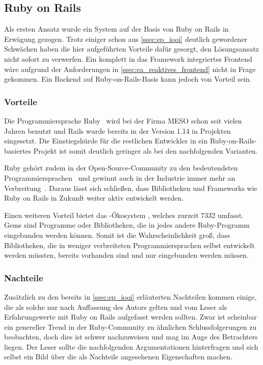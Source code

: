 \subsection{Ruby on Rails}
\label{ssec:kl_ruby_on_rails}

Als ersten Ansatz wurde ein System auf der Basis von Ruby on Rails in Erwägung
gezogen.  Trotz einiger schon aus
\cref{ssec:ep_iooi} deutlich gewordener
Schwächen haben die hier aufgeführten Vorteile dafür gesorgt, den Lösungsansatz
nicht sofort zu verwerfen.  Ein komplett in das Framework integriertes Frontend
wäre aufgrund der Anforderungen in \cref{ssec:ea_reaktives_frontend} nicht in
Frage gekommen.  Ein Backend auf Ruby-on-Rails-Basis kann jedoch von Vorteil
sein.

\subsubsection{Vorteile}
\label{sssec:elr_vorteile}

Die Programmiersprache Ruby~\cite{ruby} wird bei der Firma MESO schon seit vielen
Jahren benutzt und Rails wurde bereits in der Version 1.14 in Projekten
eingesetzt.  Die Einstiegshürde für die restlichen Entwickler in ein
Ruby-on-Rails-basiertes Projekt ist somit deutlich geringer als bei den
nachfolgenden Varianten.

Ruby gehört zudem in der Open-Source-Community zu den bedeutendsten
Programmiersprachen~\cite{ghlangtrends} und gewinnt auch in der Industrie immer
mehr an Verbreitung~\cite{tiobe}.  Daraus lässt sich schließen, dass
Bibliotheken und Frameworks wie Ruby on Rails in Zukunft weiter aktiv entwickelt
werden.

Einen weiteren Vorteil bietet das -Ökosystem
\cite{rubygems}, welches zurzeit 7332  umfasst.  Gems sind
Programme oder Bibliotheken, die in jedes andere Ruby-Programm eingebunden
werden können.  Somit ist die Wahrscheinlichkeit groß, dass Bibliotheken, die
in weniger verbreiteten Programmiersprachen selbst entwickelt werden müssten,
bereits vorhanden sind und nur eingebunden werden müssen.

\subsubsection{Nachteile}
\label{sssec:elr_nachteile}

Zusätzlich zu den bereits in \cref{ssec:ep_iooi} erläuterten Nachteilen kommen
einige, die als solche nur nach Auffassung des Autors gelten und vom Leser als
Erfahrungswerte mit Ruby on Rails aufgefasst werden sollten.  Zwar ist
scheinbar ein genereller Trend in der Ruby-Community zu ähnlichen
Schlussfolgerungen zu beobachten, doch dies ist schwer nachzuweisen und mag im
Auge des Betrachters liegen.  Der Leser sollte die nachfolgenden
Argumentationen hinterfragen und sich selbst ein Bild über die als Nachteile
angesehenen Eigenschaften machen.

